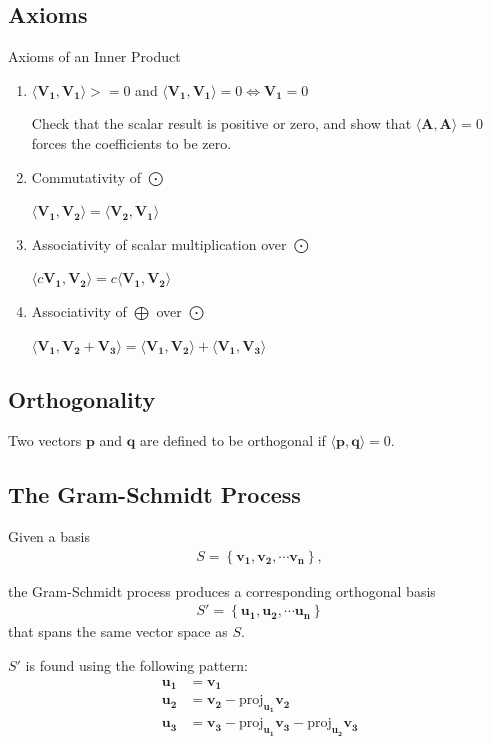 \documentclass[a4paper,10pt]{report}
\newcommand{\ip}[2]{\langle#1,#2\rangle}	%
\newcommand{\vb}[1]{\mathbf{#1}}		%
\begin{document}
  \subsection{Axioms}
     Axioms of an Inner Product
    \begin{enumerate}
      \item
		$\ip{\vb{V_1}}{\vb{V_1}} >= 0$ and $\ip{\vb{V_1}}{\vb{V_1}}=0\iff\vb{V_1} = 0$

		Check that the scalar result is positive or zero, and show that $\ip{\vb{A}}{\vb{A}} = 0$ forces the coefficients to be zero.
      \item
		Commutativity of $\bigodot$

		$\ip{\vb{V_1}}{\vb{V_2}} = \ip{\vb{V_2}}{\vb{V_1}}$
      \item
		Associativity of scalar multiplication over $\bigodot$

		$\ip{c\vb{V_1}}{\vb{V_2}} = c\ip{\vb{V_1}}{\vb{V_2}}$
      \item
		Associativity of $\bigoplus$ over $\bigodot$

		$\ip{\vb{V_1}}{\vb{V_2} + \vb{V_3}} = \ip{\vb{V_1}}{\vb{V_2}} + \ip{\vb{V_1}}{\vb{V_3}}$
    \end{enumerate}

  \subsection{Orthogonality}
    Two vectors $\vb{p}$ and $\vb{q}$ are defined to be orthogonal if $\ip{\vb{p}}{\vb{q}} = 0$.

  \subsection{The Gram-Schmidt Process}
    Given a basis
    \begin{align*}
      S = \left\{\mathbf{v_1, v_2, \cdots v_n}\right\},
    \end{align*}

    the Gram-Schmidt process produces a corresponding orthogonal basis
    \begin{align*}
      S' = \left\{\mathbf{u_1, u_2, \cdots u_n}\right\}
    \end{align*}
    that spans the same vector space as $S$.

    $S'$ is found using the following pattern:
    \begin{align*}
    \mathbf{u_1} &= \mathbf{v_1} \\
    \mathbf{u_2} &= \mathbf{v_2} - \text{proj}_{\mathbf{u_1}} \mathbf{v_2}\\
    \mathbf{u_3} &= \mathbf{v_3} - \text{proj}_{\mathbf{u_1}} \mathbf{v_3} - \text{proj}_{\mathbf{u_2}} \mathbf{v_3}\\
    \end{align*}
\end{document}
